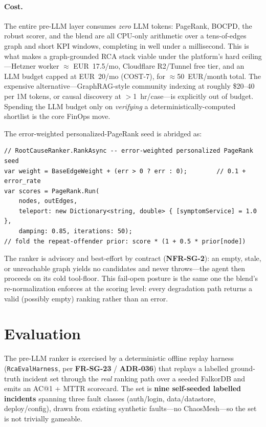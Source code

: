 \documentclass[11pt]{article}
\begin{document}
\paragraph{Cost.}
The entire pre-LLM layer consumes \emph{zero} LLM tokens: PageRank, BOCPD, the
robust scorer, and the blend are all CPU-only arithmetic over a tens-of-edges
graph and short KPI windows, completing in well under a millisecond. This is what
makes a graph-grounded RCA stack viable under the platform's hard ceiling---Hetzner
worker $\approx$ EUR~17.5/mo, Cloudflare R2/Tunnel free tier, and an LLM budget
capped at EUR~20/mo (COST-7), for $\approx$50~EUR/month total. The expensive
alternative---GraphRAG-style community indexing at roughly \$20--40 per 1M tokens,
or causal discovery at $>$1~hr/case---is explicitly out of budget. Spending the LLM
budget only on \emph{verifying} a deterministically-computed shortlist is the core
FinOps move.

The error-weighted personalized-PageRank seed is abridged as:
\begin{verbatim}
// RootCauseRanker.RankAsync -- error-weighted personalized PageRank seed
var weight = BaseEdgeWeight + (err > 0 ? err : 0);        // 0.1 + error_rate
var scores = PageRank.Run(
    nodes, outEdges,
    teleport: new Dictionary<string, double> { [symptomService] = 1.0 },
    damping: 0.85, iterations: 50);
// fold the repeat-offender prior: score * (1 + 0.5 * prior[node])
\end{verbatim}

The ranker is advisory and best-effort by contract (\textbf{NFR-SG-2}): an empty,
stale, or unreachable graph yields no candidates and never throws---the agent then
proceeds on its cold tool-floor. This fail-open posture is the same one the
blend's re-normalization enforces at the scoring level: every degradation path
returns a valid (possibly empty) ranking rather than an error.

\section{Evaluation}
\label{sec:eval}

The pre-LLM ranker is exercised by a deterministic offline replay harness
(\texttt{RcaEvalHarness}, per \textbf{FR-SG-23} / \textbf{ADR-036}) that replays a
labelled ground-truth incident set through the \emph{real} ranking path over a
seeded FalkorDB and emits an AC@1 + MTTR scorecard. The set is \textbf{nine
self-seeded labelled incidents} spanning three fault classes (auth/login,
data/datastore, deploy/config), drawn from existing synthetic faults---no
ChaosMesh---so the set is not trivially gameable.
\end{document}
